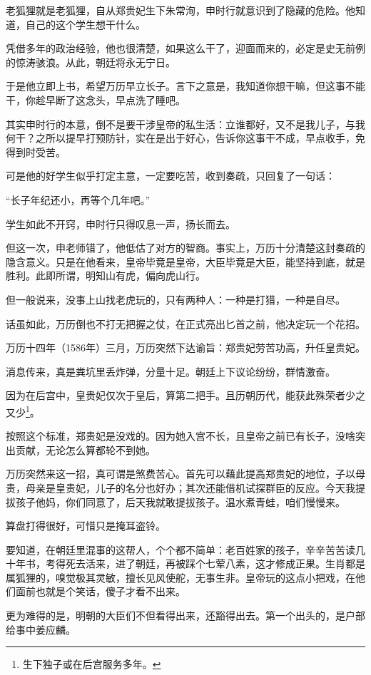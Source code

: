 \begin{multicols}{\theparacolNo}
老狐狸就是老狐狸，自从郑贵妃生下朱常洵，申时行就意识到了隐藏的危险。他知道，自己的这个学生想干什么。

凭借多年的政治经验，他也很清楚，如果这么干了，迎面而来的，必定是史无前例的惊涛骇浪。从此，朝廷将永无宁日。

于是他立即上书，希望万历早立长子。言下之意是，我知道你想干嘛，但这事不能干，你趁早断了这念头，早点洗了睡吧。

其实申时行的本意，倒不是要干涉皇帝的私生活：立谁都好，又不是我儿子，与我何干？之所以提早打预防针，实在是出于好心，告诉你这事干不成，早点收手，免得到时受苦。

可是他的好学生似乎打定主意，一定要吃苦，收到奏疏，只回复了一句话：

“长子年纪还小，再等个几年吧。”

学生如此不开窍，申时行只得叹息一声，扬长而去。

但这一次，申老师错了，他低估了对方的智商。事实上，万历十分清楚这封奏疏的隐含意义。只是在他看来，皇帝毕竟是皇帝，大臣毕竟是大臣，能坚持到底，就是胜利。此即所谓，明知山有虎，偏向虎山行。

但一般说来，没事上山找老虎玩的，只有两种人：一种是打猎，一种是自尽。

话虽如此，万历倒也不打无把握之仗，在正式亮出匕首之前，他决定玩一个花招。

万历十四年（1586年）三月，万历突然下达谕旨：郑贵妃劳苦功高，升任皇贵妃。

消息传来，真是粪坑里丢炸弹，分量十足。朝廷上下议论纷纷，群情激奋。

因为在后宫中，皇贵妃仅次于皇后，算第二把手。且历朝历代，能获此殊荣者少之又少\footnote{生下独子或在后宫服务多年。}。

按照这个标准，郑贵妃是没戏的。因为她入宫不长，且皇帝之前已有长子，没啥突出贡献，无论怎么算都轮不到她。

万历突然来这一招，真可谓是煞费苦心。首先可以藉此提高郑贵妃的地位，子以母贵，母亲是皇贵妃，儿子的名分也好办；其次还能借机试探群臣的反应。今天我提拔孩子他妈，你们同意了，后天我就敢提拔孩子。温水煮青蛙，咱们慢慢来。

算盘打得很好，可惜只是掩耳盗铃。

要知道，在朝廷里混事的这帮人，个个都不简单：老百姓家的孩子，辛辛苦苦读几十年书，考得死去活来，进了朝廷，再被踩个七荤八素，这才修成正果。生肖都是属狐狸的，嗅觉极其灵敏，擅长见风使舵，无事生非。皇帝玩的这点小把戏，在他们面前也就是个笑话，傻子才看不出来。

更为难得的是，明朝的大臣们不但看得出来，还豁得出去。第一个出头的，是户部给事中姜应麟。


\end{multicols}
